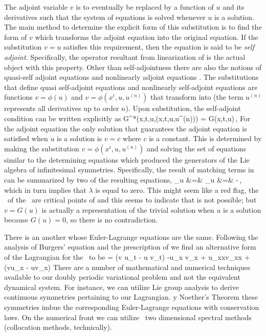 The adjoint variable $v$ is to eventually be replaced by a function of
$u$ and its derivatives such that the system of equations
 is solved whenever $u$ is a solution. The main
method to determine the explicit form of this substitution is to find the
form of $v$ which transforms the adjoint equation into the original
equation. If the substitution $v=u$ satisfies this requirement, then the
equation is said to be \textit{self adjoint}. Specifically, the operator
resultant from linearization of  is the actual object with
this property. Other than self-adjointness there are also the notions of
quasi-self adjoint equations and nonlinearly adjoint equations
. The
substitutions that define quasi self-adjoint equations and nonlinearly
self-adjoint equations are functions $v = \phi(u)$ and
$v=\phi(x^i,u,u^{(n)})$ that transform  into
 (the term $u^{(n)}$ represents all derivatives up to order
$n$).
Upon substitution,
the self-adjoint condition can be written explicitly
as
\beq \label{e-selfadjoint}
G^*(x,t,u,\phi(x,t,u,u^{(n)})) = \lambda G(x,t,u)\,,
\eeq
For the adjoint
equation 
the only solution that guarantees the adjoint equation 
is satisfied when $u$ is a solution is $v=c$ where $c$ is a constant.
This is determined by making the substitution $v=\phi(x^i,u,u^{(n)})$
and solving the set of equations similar to the determining
equations which produced the generators of the Lie
algebra of infinitesimal symmetries. Specifically, the result
of matching terms in 
can be summarized by two of the resulting equations,
\bea
\phi_u &=& \lambda \continue
\phi_u &=& -\lambda \,,
\eea
which in turn implies that $\lambda$ is equal to zero.
This might seem like a red flag, the \twots\ of the \KSe\
are critical points of  and this
seems to indicate that is not possible; but $v=G(u)$
is actually a representation of the trivial solution when $u$
is a solution because $G(u)=0$, so there is no contradiction.

There is an another  whose
Euler-Lagrange equations are the same.
Following the analysis of Burgers' equation and
the prescription of
we find an alternative form of the Lagrangian for the \KSe\ to be
\beq
{} = (v u_t - u v_t) -u_x v_x + u_{xx}v_xx + (vu_x - uv_x)
\eeq
There are a number of mathematical and
numerical techniques available
to our doubly periodic variational problem
and not the
equivalent dynamical system. For instance, we can utilize
Lie group analysis
to derive continuous symmetries pertaining to our Lagrangian.
y Noether's
Theorem these symmetries imbue the corresponding
Euler-Lagrange equations with conservation laws.
On the numerical front we can utilize \spt\ two dimensional
spectral methods (collocation methods, technically).

